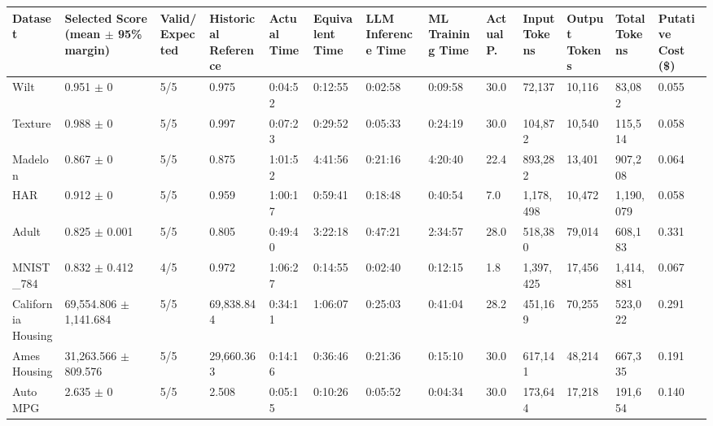\begin{tabular}{lllllllllllll}
\hline
Dataset & Selected Score (mean \ensuremath{\pm} 95\% margin) & Valid/Expected & Historical Reference & Actual Time & Equivalent Time & LLM Inference Time & ML Training Time & Actual P. & Input Tokens & Output Tokens & Total Tokens & Putative Cost (\$) \\
\hline
Wilt & 0.951 \ensuremath{\pm} 0 & 5/5 & 0.975 & 0:04:52 & 0:12:55 & 0:02:58 & 0:09:58 & 30.0 & 72,137 & 10,116 & 83,082 & 0.055 \\
Texture & 0.988 \ensuremath{\pm} 0 & 5/5 & 0.997 & 0:07:23 & 0:29:52 & 0:05:33 & 0:24:19 & 30.0 & 104,872 & 10,540 & 115,514 & 0.058 \\
Madelon & 0.867 \ensuremath{\pm} 0 & 5/5 & 0.875 & 1:01:52 & 4:41:56 & 0:21:16 & 4:20:40 & 22.4 & 893,282 & 13,401 & 907,208 & 0.064 \\
HAR & 0.912 \ensuremath{\pm} 0 & 5/5 & 0.959 & 1:00:17 & 0:59:41 & 0:18:48 & 0:40:54 & 7.0 & 1,178,498 & 10,472 & 1,190,079 & 0.058 \\
Adult & 0.825 \ensuremath{\pm} 0.001 & 5/5 & 0.805 & 0:49:40 & 3:22:18 & 0:47:21 & 2:34:57 & 28.0 & 518,380 & 79,014 & 608,183 & 0.331 \\
MNIST\_784 & 0.832 \ensuremath{\pm} 0.412 & 4/5 & 0.972 & 1:06:27 & 0:14:55 & 0:02:40 & 0:12:15 & 1.8 & 1,397,425 & 17,456 & 1,414,881 & 0.067 \\
California Housing & 69,554.806 \ensuremath{\pm} 1,141.684 & 5/5 & 69,838.844 & 0:34:11 & 1:06:07 & 0:25:03 & 0:41:04 & 28.2 & 451,169 & 70,255 & 523,022 & 0.291 \\
Ames Housing & 31,263.566 \ensuremath{\pm} 809.576 & 5/5 & 29,660.363 & 0:14:16 & 0:36:46 & 0:21:36 & 0:15:10 & 30.0 & 617,141 & 48,214 & 667,335 & 0.191 \\
Auto MPG & 2.635 \ensuremath{\pm} 0 & 5/5 & 2.508 & 0:05:15 & 0:10:26 & 0:05:52 & 0:04:34 & 30.0 & 173,644 & 17,218 & 191,654 & 0.140 \\
\hline
\end{tabular}
